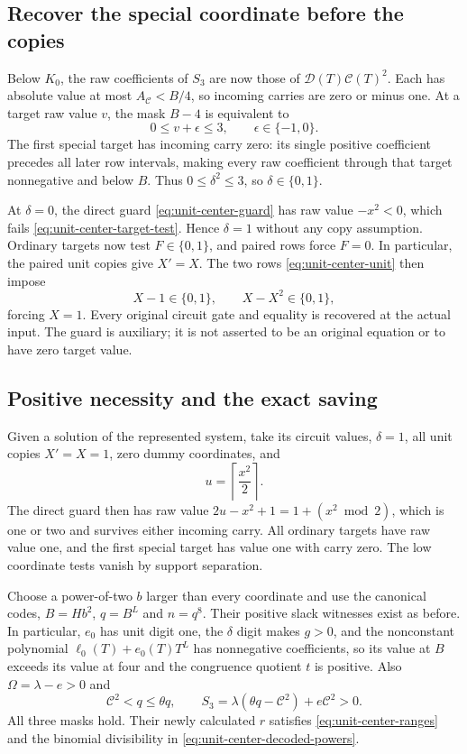 \subsection{Recover the special coordinate before the copies}

Below $K_0$, the raw coefficients of $S_3$ are now those of
$\mathcal D(T)\mathcal C(T)^2$. Each has absolute value at most
$A_{\mathcal C}<B/4$, so incoming carries are zero or minus one.
At a target raw value $v$, the mask $B-4$ is equivalent to
\begin{equation}\label{eq:unit-center-target-test}
 0\le v+\epsilon\le3,\qquad\epsilon\in\{-1,0\}.
\end{equation}
The first special target has incoming carry zero: its single
positive coefficient precedes all later row intervals, making
every raw coefficient through that target nonnegative and below
$B$. Thus $0\le\delta^2\le3$, so $\delta\in\{0,1\}$.

At $\delta=0$, the direct guard \eqref{eq:unit-center-guard} has
raw value $-x^2<0$, which fails
\eqref{eq:unit-center-target-test}. Hence $\delta=1$ without any
copy assumption. Ordinary targets now test $F\in\{0,1\}$, and
paired rows force $F=0$. In particular, the paired unit copies give
$X'=X$. The two rows \eqref{eq:unit-center-unit} then impose
\[
 X-1\in\{0,1\},\qquad X-X^2\in\{0,1\},
\]
forcing $X=1$. Every original circuit gate and equality is recovered
at the actual input. The guard is auxiliary; it is not asserted to
be an original equation or to have zero target value.

\subsection{Positive necessity and the exact saving}

Given a solution of the represented system, take its circuit values,
$\delta=1$, all unit copies $X'=X=1$, zero dummy coordinates, and
\[
 u=\left\lceil\frac{x^2}{2}\right\rceil.
\]
The direct guard then has raw value
$2u-x^2+1=1+(x^2\bmod2)$, which is one or two and survives either
incoming carry. All ordinary targets have raw value one, and the
first special target has value one with carry zero. The low
coordinate tests vanish by support separation.

Choose a power-of-two $b$ larger than every coordinate and use the
canonical codes, $B=Hb^2$, $q=B^L$ and $n=q^8$. Their positive
slack witnesses exist as before. In particular, $e_0$ has unit
digit one, the $\delta$ digit makes $g>0$, and the nonconstant
polynomial $\ell_0(T)+e_0(T)T^L$ has nonnegative coefficients, so
its value at $B$ exceeds its value at four and the congruence
quotient $t$ is positive. Also $\Omega=\lambda-e>0$ and
\[
 \mathcal C^2<q\le\theta q,
 \qquad
 S_3=\lambda(\theta q-\mathcal C^2)+e\mathcal C^2>0.
\]
All three masks hold. Their newly calculated $r$ satisfies
\eqref{eq:unit-center-ranges} and the binomial divisibility in
\eqref{eq:unit-center-decoded-powers}.

